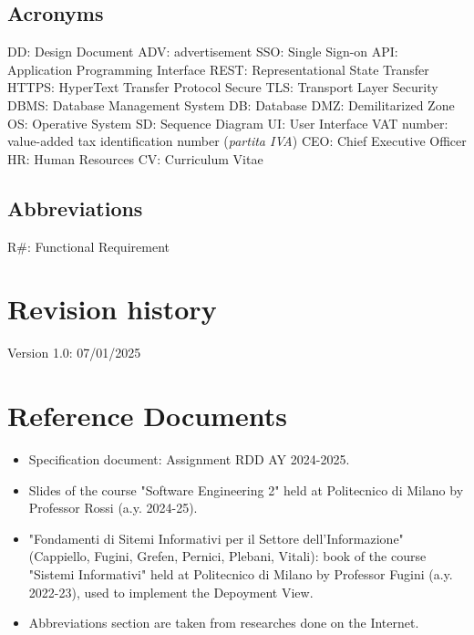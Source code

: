 \subsection{Acronyms}
DD: Design Document\newline
ADV: advertisement\newline
SSO: Single Sign-on \newline
API: Application Programming Interface\newline
REST: Representational State Transfer\newline
HTTPS: HyperText Transfer Protocol Secure\newline
TLS: Transport Layer Security \newline
DBMS: Database Management System
DB: Database\newline
DMZ: Demilitarized Zone\newline
OS: Operative System\newline
SD: Sequence Diagram\newline
UI: User Interface\newline
VAT number: value-added tax identification number (\textit {partita IVA})\newline
CEO: Chief Executive Officer \newline
HR: Human Resources\newline
CV: Curriculum Vitae
\subsection{Abbreviations}
R\#: Functional Requirement

\section{Revision history}
Version 1.0: 07/01/2025

\section{Reference Documents}
\begin{itemize}
    \item Specification document: Assignment RDD AY 2024-2025.
    \item Slides of the course "Software Engineering 2" held at Politecnico di Milano by Professor Rossi (a.y. 2024-25).
    \item "Fondamenti di Sitemi Informativi per il Settore dell'Informazione" (Cappiello, Fugini, Grefen, Pernici, Plebani, Vitali): book of the course "Sistemi Informativi" held at Politecnico di Milano by Professor Fugini (a.y. 2022-23), used to implement the Depoyment View.
    \item Abbreviations section are taken from researches done on the Internet.
\end{itemize}

